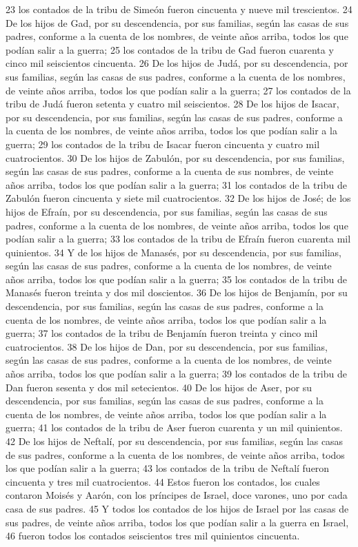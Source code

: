 23 los contados de la tribu de Simeón fueron cincuenta y nueve mil trescientos.
24 De los hijos de Gad, por su descendencia, por sus familias, según las casas de sus padres, conforme a la cuenta de los nombres, de veinte años arriba, todos los que podían salir a la guerra;
25 los contados de la tribu de Gad fueron cuarenta y cinco mil seiscientos cincuenta.
26 De los hijos de Judá, por su descendencia, por sus familias, según las casas de sus padres, conforme a la cuenta de los nombres, de veinte años arriba, todos los que podían salir a la guerra;
27 los contados de la tribu de Judá fueron setenta y cuatro mil seiscientos.
28 De los hijos de Isacar, por su descendencia, por sus familias, según las casas de sus padres, conforme a la cuenta de los nombres, de veinte años arriba, todos los que podían salir a la guerra;
29 los contados de la tribu de Isacar fueron cincuenta y cuatro mil cuatrocientos.
30 De los hijos de Zabulón, por su descendencia, por sus familias, según las casas de sus padres, conforme a la cuenta de sus nombres, de veinte años arriba, todos los que podían salir a la guerra;
31 los contados de la tribu de Zabulón fueron cincuenta y siete mil cuatrocientos.
32 De los hijos de José; de los hijos de Efraín, por su descendencia, por sus familias, según las casas de sus padres, conforme a la cuenta de los nombres, de veinte años arriba, todos los que podían salir a la guerra;
33 los contados de la tribu de Efraín fueron cuarenta mil quinientos.
34 Y de los hijos de Manasés, por su descendencia, por sus familias, según las casas de sus padres, conforme a la cuenta de los nombres, de veinte años arriba, todos los que podían salir a la guerra;
35 los contados de la tribu de Manasés fueron treinta y dos mil doscientos. 
36 De los hijos de Benjamín, por su descendencia, por sus familias, según las casas de sus padres, conforme a la cuenta de los nombres, de veinte años arriba, todos los que podían salir a la guerra;
37 los contados de la tribu de Benjamín fueron treinta y cinco mil cuatrocientos.
38 De los hijos de Dan, por su descendencia, por sus familias, según las casas de sus padres, conforme a la cuenta de los nombres, de veinte años arriba, todos los que podían salir a la guerra;
39 los contados de la tribu de Dan fueron sesenta y dos mil setecientos.
40 De los hijos de Aser, por su descendencia, por sus familias, según las casas de sus padres, conforme a la cuenta de los nombres, de veinte años arriba, todos los que podían salir a la guerra;
41 los contados de la tribu de Aser fueron cuarenta y un mil quinientos.
42 De los hijos de Neftalí, por su descendencia, por sus familias, según las casas de sus padres, conforme a la cuenta de los nombres, de veinte años arriba, todos los que podían salir a la guerra;
43 los contados de la tribu de Neftalí fueron cincuenta y tres mil cuatrocientos.
44 Estos fueron los contados, los cuales contaron Moisés y Aarón, con los príncipes de Israel, doce varones, uno por cada casa de sus padres.
45 Y todos los contados de los hijos de Israel por las casas de sus padres, de veinte años arriba, todos los que podían salir a la guerra en Israel,
46 fueron todos los contados seiscientos tres mil quinientos cincuenta.

